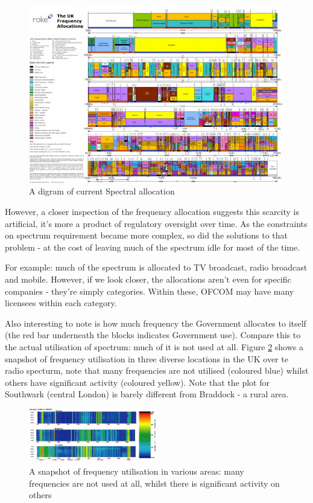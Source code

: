 \begin{figure}[h]
\centering
\includegraphics[height = 7 cm]{uk-spectrum-allocation-chart1-640x445.jpg}
\caption{A digram of current Spectral allocation \cite{Strategy2013}}
\label{spectrumalloc}
\end{figure}

However, a closer inspection of the frequency allocation suggests this scarcity is artificial, it's more a product of regulatory oversight over time. As the constraints on spectrum requirement became more complex, so did the solutions to that problem - at the cost of leaving much of the spectrum idle for most of the time. 

For example: much of the spectrum is allocated to TV broadcast, radio broadcast and mobile. However, if we look closer, the allocations aren't even for specific companies - they're simply categories. Within these, OFCOM may have many licensees within each category.

Also interesting to note is how much frequency the Government allocates to itself (the red bar underneath the blocks indicates Government use). Compare this to the actual utilisation of spectrum: much of it is not used at all. Figure \ref{frequtil} shows a snapshot of frequency utilisation in three diverse locations in the UK over te radio specturm, note that many frequencies are not utilised (coloured blue) whilst others have significant activity (coloured yellow). Note that the plot for Southwark (central London) is barely different from Braddock - a rural area. 

\begin{figure}[h]
\centering
\includegraphics[height = 7 cm, width=0.5\textwidth]{cr2.jpg}
\caption{A snapshot of frequency utilisation in various areas: many frequencies are not used at all, whilst there is significant activity on others \cite{Burbidge2007}}
\label{frequtil}
\end{figure}

